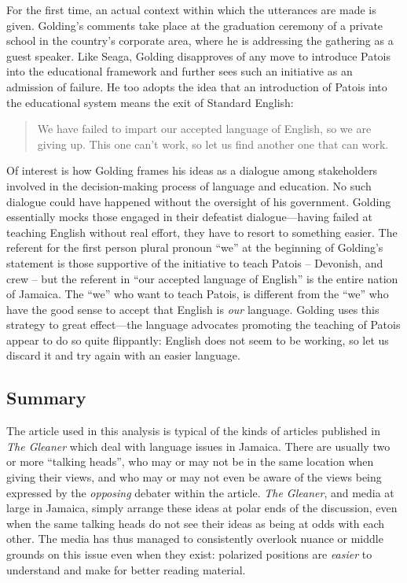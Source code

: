 \documentclass[output=paper,colorlinks,citecolor=brown]{langscibook}
\begin{document}
For the first time, an actual context within which the utterances are made is given. Golding’s comments take place at the graduation ceremony of a private school in the country’s corporate area, where he is addressing the gathering as a guest speaker. Like Seaga, Golding disapproves of any move to introduce Patois into the educational framework and further sees such an initiative as an admission of failure. He too adopts the idea that an introduction of Patois into the educational system means the exit of Standard English: 

\begin{quote}
We have failed to impart our accepted language of English, so we are giving up. This one can't work, so let us find another one that can work.
\end{quote}

Of interest is how Golding frames his ideas as a dialogue among stakeholders involved in the decision-making process of language and education. No such dialogue could have happened without the oversight of his government. Golding essentially mocks those engaged in their defeatist dialogue—having failed at teaching English without real effort, they have to resort to something easier. The referent for the first person plural pronoun “we” at the beginning of Golding’s statement is those supportive of the initiative to teach Patois -- Devonish, and crew -- but the referent in “our accepted language of English” is the entire nation of Jamaica. The “we” who want to teach Patois, is different from the “we” who have the good sense to accept that English is \emph{our} language. Golding uses this strategy to great effect—the language advocates promoting the teaching of Patois appear to do so quite flippantly: English does not seem to be working, so let us discard it and try again with an easier language.


\subsection{Summary}

The article used in this analysis is typical of the kinds of articles published in \textit{The Gleaner} which deal with language issues in Jamaica. There are usually two or more “talking heads”, who may or may not be in the same location when giving their views, and who may or may not even be aware of the views being expressed by the \emph{opposing} debater within the article. \textit{The Gleaner}, and media at large in Jamaica, simply arrange these ideas at polar ends of the discussion, even when the same talking heads do not see their ideas as being at odds with each other. The media has thus managed to consistently overlook nuance or middle grounds on this issue even when they exist: polarized positions are \emph{easier} to understand and make for better reading material. 
\end{document}
